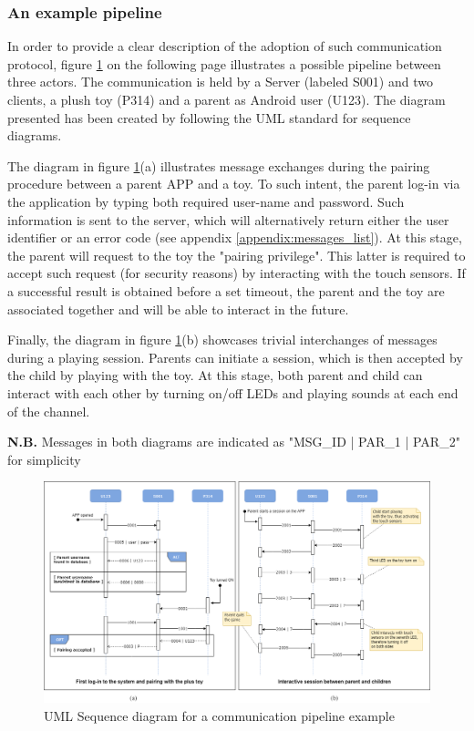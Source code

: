\subsubsection{An example pipeline}
In order to provide a clear description of the adoption of such communication protocol, figure \ref{fig:SE_sequenceDiag} on the following page illustrates a possible pipeline between three actors. The communication is held by a Server (labeled S001) and two clients, a plush toy (P314) and a parent as Android user (U123). The diagram presented has been created by following the UML standard for sequence diagrams.

\medskip
The diagram in figure \ref{fig:SE_sequenceDiag}(a) illustrates message exchanges during the pairing procedure between a parent APP and a toy. To such intent, the parent log-in via the application by typing both required user-name and password. Such information is sent to the server, which will alternatively return either the user identifier or an error code (see appendix \ref{appendix:messages_list}). At this stage, the parent will request to the toy the "pairing privilege". This latter is required to accept such request (for security reasons) by interacting with the touch sensors. If a successful result is obtained before a set timeout, the parent and the toy are associated together and will be able to interact in the future.

\medskip
Finally, the diagram in figure \ref{fig:SE_sequenceDiag}(b) showcases trivial interchanges of messages during a playing session. Parents can initiate a session, which is then accepted by the child by playing with the toy. At this stage, both parent and child can interact with each other by turning on/off LEDs and playing sounds at each end of the channel.

\bigskip
\noindent
\textbf{N.B.} Messages in both diagrams are indicated as "MSG\_ID | PAR\_1 | PAR\_2" for simplicity

\begin{figure}
    \includegraphics[scale=0.58]{images/SE_communication_sequence.png}
    \caption{UML Sequence diagram for a communication pipeline example}
    \label{fig:SE_sequenceDiag}
\end{figure}